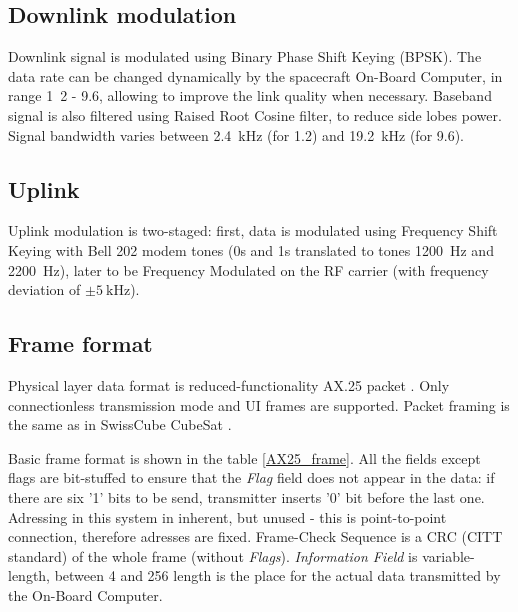 \subsection{Downlink modulation}
Downlink signal is modulated using Binary Phase Shift Keying (BPSK). The data rate can be changed dynamically by the spacecraft On-Board Computer, in range \si{1.2} - \SI{9.6}{\kbps}, allowing to improve the link quality when necessary. Baseband signal is also filtered using Raised Root Cosine filter, to reduce side lobes power. Signal bandwidth varies between \SI{2.4}{\kHz} (for \SI{1.2}{\kbps}) and \SI{19.2}{\kHz} (for \SI{9.6}{\kbps}).


\subsection{Uplink}
Uplink modulation is two-staged: first, data is modulated using Frequency Shift Keying with Bell 202 modem tones (0s and 1s translated to tones \SI{1200}{\hertz} and \SI{2200}{\hertz}), later to be Frequency Modulated on the RF carrier (with frequency deviation of $\pm\SI{5}{\kilo\hertz}$).


\subsection{Frame format}
Physical layer data format is reduced-functionality AX.25 packet \cite{AX25_standard}. Only connectionless transmission mode and UI frames are supported. Packet framing is the same as in SwissCube CubeSat \cite{SwissCube_AX25}.

Basic frame format is shown in the table \ref{AX25_frame}. All the fields except flags are bit-stuffed to ensure that the \textit{Flag} field does not appear in the data: if there are six '1' bits to be send, transmitter inserts '0' bit before the last one. Adressing in this system in inherent, but unused - this is point-to-point connection, therefore adresses are fixed. Frame-Check Sequence is a CRC (CITT standard) of the whole frame (without \textit{Flags}). \textit{Information Field} is variable-length, between \si{4} and \SI{256}{\byte} length is the place for the actual data transmitted by the On-Board Computer.

